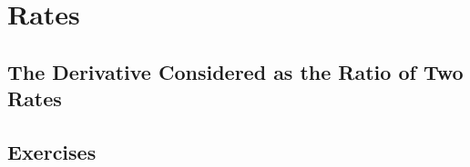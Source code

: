 \chapter{Rates}
\label{ch:10}

\section{The Derivative Considered as the Ratio of Two Rates}
\label{sec:10:01}

\section{Exercises}
\label{sec:10:02}

